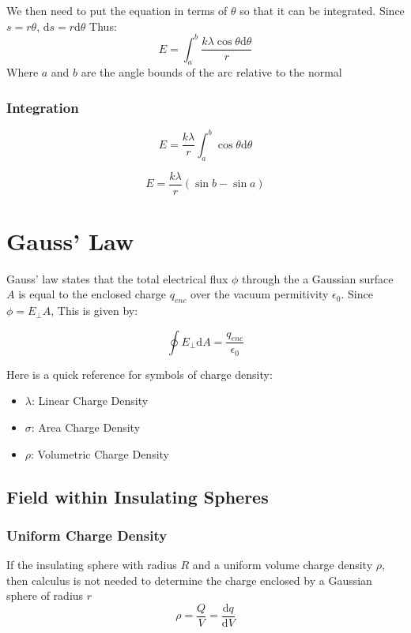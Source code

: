 \documentclass[a4paper,12pt]{article}
\begin{document}
								We then need to put the equation in terms of $\theta$ so that it can be integrated. Since $s = r\theta$, $\mathrm{d}s = r\mathrm{d}\theta$ Thus:
								\begin{equation*}
										E = \int_{a}^{b} \frac{k\lambda \cos{\theta}\mathrm{d}\theta}{r}
								\end{equation*}
								Where $a$ and $b$ are the angle bounds of the arc relative to the normal

						\subsubsection{Integration}
								\begin{equation*}
										E =\frac{k\lambda}{r}  \int_{a}^{b} \cos{\theta}\mathrm{d}\theta
								\end{equation*}

								\begin{equation*}
										E = \frac{k\lambda}{r} (\sin{b} - \sin{a})
								\end{equation*}
		\section{Gauss' Law}
				Gauss' law states that the total electrical flux $\phi$ through the a Gaussian surface $A$ is equal to the enclosed charge $q_{enc}$ over the vacuum permitivity $\epsilon_{0}$. Since $\phi = E_{\bot} A$, This is given by:

				\begin{equation*}
						\oint E_{ \bot} \mathrm{d}A = \frac{q_{enc}}{\epsilon_{0}}
				\end{equation*}

				Here is a quick reference for symbols of charge density:
				\begin{itemize}
						\item $\lambda$: Linear Charge Density
						\item $\sigma$: Area Charge Density
						\item $\rho$: Volumetric Charge Density
				\end{itemize}
				\subsection{Field within Insulating Spheres}
						\subsubsection{Uniform Charge Density}
								If the insulating sphere with radius $R$ and a uniform volume charge density $\rho$, then calculus is not needed to determine the charge enclosed by a Gaussian sphere of radius $r$
								\begin{equation*}
										\rho = \frac{Q}{V} = \frac{\mathrm{d}q}{\mathrm{d}V} 
								\end{equation*}
\end{document}
